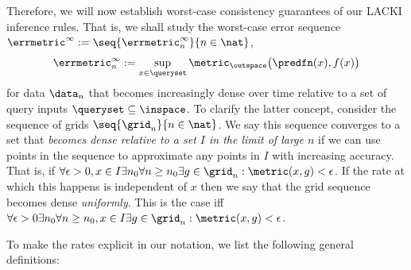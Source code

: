 Therefore, we will now establish worst-case consistency guarantees of our LACKI inference rules. That is, we shall study the worst-case error  
sequence $\errmetric^\infty :=\seq{\errmetric^\infty_n}{n \in \nat}$, 
\begin{equation}
\errmetric^\infty_n := \sup_{x \in \queryset } \metric_\outspace\bigl(\predfn(x), f(x)\bigr)\end{equation}
for data $\data_n$ that becomes increasingly dense over time relative to a set of query inputs $\queryset \subseteq \inspace$. 
To clarify the latter concept, 
consider the sequence of grids $\seq{\grid_n}{n \in \nat}$. 
We say this sequence converges to a set that \emph{becomes dense relative to a set $I$ in the limit of large $n$ } if we can use points in the sequence to approximate any points in $I$ with increasing accuracy. That is, if $\forall \epsilon >0,x \in I \exists n_0 \forall n \geq n_0 \exists g \in \grid_n: \metric(x,g) < \epsilon$. If the rate at which this happens is independent of $x$ then we say that the grid sequence becomes dense \emph{uniformly}. This is the case iff $\forall \epsilon >0 \exists n_0 \forall n \geq n_0, x \in I \exists g \in \grid_n: \metric(x,g) < \epsilon$.

To make the rates explicit in our notation, we list the following general definitions: 



